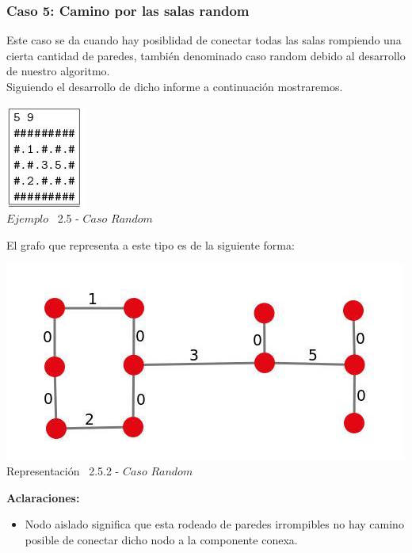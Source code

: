 \begin{center}
 \subsubsection*{Caso 5: Camino por las salas random}
\end{center}

Este caso se da cuando hay posiblidad de conectar todas las salas rompiendo una cierta cantidad de paredes, tambi\'en denominado caso random debido al desarrollo de nuestro algoritmo.\\

Siguiendo el desarrollo de dicho informe a continuaci\'on mostraremos.\\
 
\vspace*{0.3cm} \vspace*{0.3cm}
  \begin{center}
 \includegraphics[scale=1.6]{./EJ2/ej2random.jpeg}
\\ {$Ejemplo$ \ 2.5 - $Caso$ $Random$}
  \end{center}
  \vspace*{0.3cm}

El grafo que representa a este tipo es de la siguiente forma:\\

\vspace*{0.3cm} \vspace*{0.3cm}
  \begin{center}
 \includegraphics[scale=0.5]{./EJ2/ej2graforandom.jpeg}
 \\{Representación \ 2.5.2 - $Caso$ $Random$}
  \end{center}
  \vspace*{0.3cm}

\textbf{Aclaraciones:} 
\begin{itemize}
\item Nodo aislado significa que esta rodeado de paredes irrompibles no hay camino posible de conectar dicho nodo a la componente conexa.
\end{itemize}
